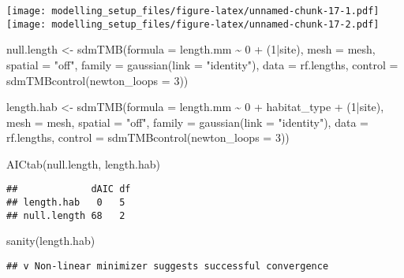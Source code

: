 \documentclass[
]{article}
\newenvironment{Shaded}{\begin{snugshade}}{\end{snugshade}}
\newcommand{\AttributeTok}[1]{\textcolor[rgb]{0.77,0.63,0.00}{#1}}
\newcommand{\DecValTok}[1]{\textcolor[rgb]{0.00,0.00,0.81}{#1}}
\newcommand{\FunctionTok}[1]{\textcolor[rgb]{0.00,0.00,0.00}{#1}}
\newcommand{\NormalTok}[1]{#1}
\newcommand{\OtherTok}[1]{\textcolor[rgb]{0.56,0.35,0.01}{#1}}
\newcommand{\SpecialCharTok}[1]{\textcolor[rgb]{0.00,0.00,0.00}{#1}}
\newcommand{\StringTok}[1]{\textcolor[rgb]{0.31,0.60,0.02}{#1}}
\begin{document}
\texttt{[image: modelling\_setup\_files/figure-latex/unnamed-chunk-17-1.pdf]}
\texttt{[image: modelling\_setup\_files/figure-latex/unnamed-chunk-17-2.pdf]}

\begin{Shaded}
\begin{Highlighting}[]
\NormalTok{null.length }\OtherTok{\textless{}{-}} \FunctionTok{sdmTMB}\NormalTok{(}\AttributeTok{formula =}\NormalTok{ length.mm }\SpecialCharTok{\textasciitilde{}} \DecValTok{0} \SpecialCharTok{+}\NormalTok{ (}\DecValTok{1}\SpecialCharTok{|}\NormalTok{site), }\AttributeTok{mesh =}\NormalTok{ mesh, }\AttributeTok{spatial =} \StringTok{"off"}\NormalTok{, }\AttributeTok{family =} \FunctionTok{gaussian}\NormalTok{(}\AttributeTok{link =} \StringTok{"identity"}\NormalTok{), }
            \AttributeTok{data =}\NormalTok{ rf.lengths, }\AttributeTok{control =} \FunctionTok{sdmTMBcontrol}\NormalTok{(}\AttributeTok{newton\_loops =} \DecValTok{3}\NormalTok{))}

\NormalTok{length.hab }\OtherTok{\textless{}{-}} \FunctionTok{sdmTMB}\NormalTok{(}\AttributeTok{formula =}\NormalTok{ length.mm }\SpecialCharTok{\textasciitilde{}} \DecValTok{0} \SpecialCharTok{+}\NormalTok{ habitat\_type }\SpecialCharTok{+}\NormalTok{ (}\DecValTok{1}\SpecialCharTok{|}\NormalTok{site), }\AttributeTok{mesh =}\NormalTok{ mesh, }\AttributeTok{spatial =} \StringTok{"off"}\NormalTok{, }\AttributeTok{family =} \FunctionTok{gaussian}\NormalTok{(}\AttributeTok{link =} \StringTok{"identity"}\NormalTok{), }
            \AttributeTok{data =}\NormalTok{ rf.lengths, }\AttributeTok{control =} \FunctionTok{sdmTMBcontrol}\NormalTok{(}\AttributeTok{newton\_loops =} \DecValTok{3}\NormalTok{))}


\FunctionTok{AICtab}\NormalTok{(null.length, length.hab)}
\end{Highlighting}
\end{Shaded}

\begin{verbatim}
##             dAIC df
## length.hab   0   5 
## null.length 68   2
\end{verbatim}

\begin{Shaded}
\begin{Highlighting}[]
\FunctionTok{sanity}\NormalTok{(length.hab)}
\end{Highlighting}
\end{Shaded}

\begin{verbatim}
## v Non-linear minimizer suggests successful convergence
\end{verbatim}
\end{document}
